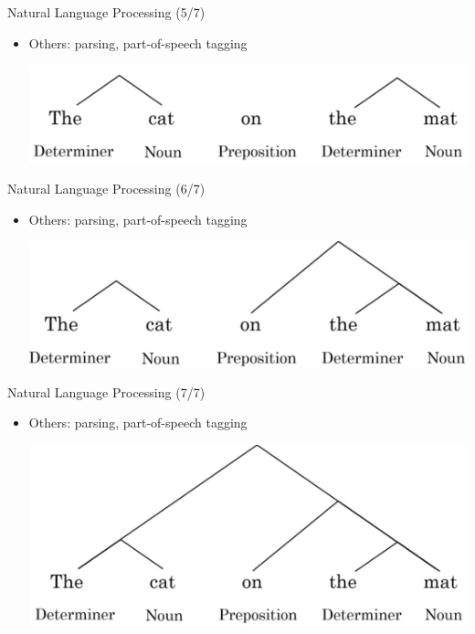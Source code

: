 \documentclass[pdf]{beamer}
\theoremstyle{mystyle}
\begin{document}
\begin{frame}{Natural Language Processing (5/7)}
	\begin{itemize}
		\item Others: parsing, part-of-speech tagging
		\begin{center}
			\includegraphics[scale=.25]{parsing-3} 	
		\end{center}
	\end{itemize}
\end{frame}

\begin{frame}{Natural Language Processing (6/7)}
	\begin{itemize}
		\item Others: parsing, part-of-speech tagging
		\begin{center}
			\includegraphics[scale=.25]{parsing-4} 	
		\end{center}
	\end{itemize}
\end{frame}

\begin{frame}{Natural Language Processing (7/7)}
	\begin{itemize}
		\item Others: parsing, part-of-speech tagging
		\begin{center}
			\includegraphics[scale=.25]{parsing-5} 	
		\end{center}
	\end{itemize}
\end{frame}
\end{document}
